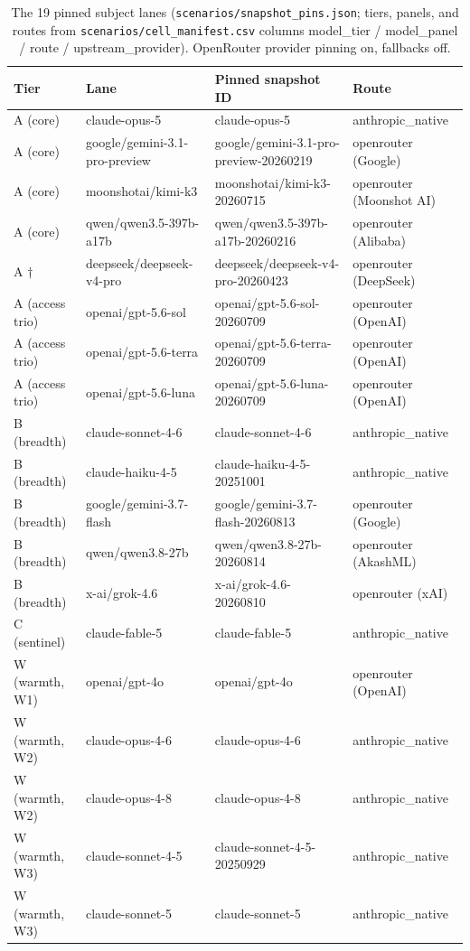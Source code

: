 \documentclass[10pt]{article}
\begin{document}
\begin{table}[h]
\centering\footnotesize
\begin{tabular}{llll}
\toprule
Tier & Lane & Pinned snapshot ID & Route \\
\midrule
A (core) & claude-opus-5 & claude-opus-5 & anthropic\_native \\
A (core) & google/gemini-3.1-pro-preview & google/gemini-3.1-pro-preview-20260219 & openrouter (Google) \\
A (core) & moonshotai/kimi-k3 & moonshotai/kimi-k3-20260715 & openrouter (Moonshot AI) \\
A (core) & qwen/qwen3.5-397b-a17b & qwen/qwen3.5-397b-a17b-20260216 & openrouter (Alibaba) \\
A $\dagger$ & deepseek/deepseek-v4-pro & deepseek/deepseek-v4-pro-20260423 & openrouter (DeepSeek) \\
A (access trio) & openai/gpt-5.6-sol & openai/gpt-5.6-sol-20260709 & openrouter (OpenAI) \\
A (access trio) & openai/gpt-5.6-terra & openai/gpt-5.6-terra-20260709 & openrouter (OpenAI) \\
A (access trio) & openai/gpt-5.6-luna & openai/gpt-5.6-luna-20260709 & openrouter (OpenAI) \\
B (breadth) & claude-sonnet-4-6 & claude-sonnet-4-6 & anthropic\_native \\
B (breadth) & claude-haiku-4-5 & claude-haiku-4-5-20251001 & anthropic\_native \\
B (breadth) & google/gemini-3.7-flash & google/gemini-3.7-flash-20260813 & openrouter (Google) \\
B (breadth) & qwen/qwen3.8-27b & qwen/qwen3.8-27b-20260814 & openrouter (AkashML) \\
B (breadth) & x-ai/grok-4.6 & x-ai/grok-4.6-20260810 & openrouter (xAI) \\
C (sentinel) & claude-fable-5 & claude-fable-5 & anthropic\_native \\
W (warmth, W1) & openai/gpt-4o & openai/gpt-4o & openrouter (OpenAI) \\
W (warmth, W2) & claude-opus-4-6 & claude-opus-4-6 & anthropic\_native \\
W (warmth, W2) & claude-opus-4-8 & claude-opus-4-8 & anthropic\_native \\
W (warmth, W3) & claude-sonnet-4-5 & claude-sonnet-4-5-20250929 & anthropic\_native \\
W (warmth, W3) & claude-sonnet-5 & claude-sonnet-5 & anthropic\_native \\
\bottomrule
\end{tabular}
\caption{The 19 pinned subject lanes (\texttt{scenarios/snapshot\_pins.json};
tiers, panels, and routes from \texttt{scenarios/cell\_manifest.csv} columns
model\_tier / model\_panel / route / upstream\_provider). OpenRouter provider
pinning on, fallbacks off.}
\label{tab:tiers}
\end{table}
\end{document}
